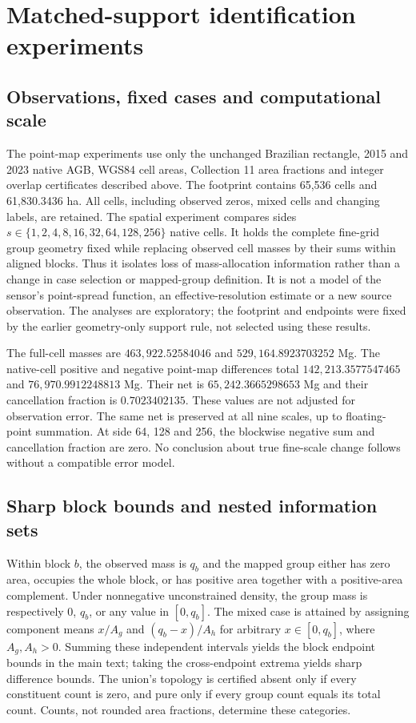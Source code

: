 \section{Matched-support identification experiments}\label{sec:identification}
\subsection{Observations, fixed cases and computational scale}
The point-map experiments use only the unchanged Brazilian rectangle, 2015 and 2023 native AGB, WGS84 cell areas, Collection 11 area fractions and integer overlap certificates described above. The footprint contains 65,536 cells and 61,830.3436 ha. All cells, including observed zeros, mixed cells and changing labels, are retained. The spatial experiment compares sides $s\in\{1,2,4,8,16,32,64,128,256\}$ native cells. It holds the complete fine-grid group geometry fixed while replacing observed cell masses by their sums within aligned blocks. Thus it isolates loss of mass-allocation information rather than a change in case selection or mapped-group definition. It is not a model of the sensor's point-spread function, an effective-resolution estimate or a new source observation. The analyses are exploratory; the footprint and endpoints were fixed by the earlier geometry-only support rule, not selected using these results.

The full-cell masses are $463{,}922.52584046$ and $529{,}164.8923703252$ Mg. The native-cell positive and negative point-map differences total $142{,}213.3577547465$ and $76{,}970.9912248813$ Mg. Their net is $65{,}242.3665298653$ Mg and their cancellation fraction is $0.7023402135$. These values are not adjusted for observation error. The same net is preserved at all nine scales, up to floating-point summation. At side 64, 128 and 256, the blockwise negative sum and cancellation fraction are zero. No conclusion about true fine-scale change follows without a compatible error model.

\subsection{Sharp block bounds and nested information sets}
Within block $b$, the observed mass is $q_b$ and the mapped group either has zero area, occupies the whole block, or has positive area together with a positive-area complement. Under nonnegative unconstrained density, the group mass is respectively $0$, $q_b$, or any value in $[0,q_b]$. The mixed case is attained by assigning component means $x/A_g$ and $(q_b-x)/A_h$ for arbitrary $x\in[0,q_b]$, where $A_g,A_h>0$. Summing these independent intervals yields the block endpoint bounds in the main text; taking the cross-endpoint extrema yields sharp difference bounds. The union's topology is certified absent only if every constituent count is zero, and pure only if every group count equals its total count. Counts, not rounded area fractions, determine these categories.

